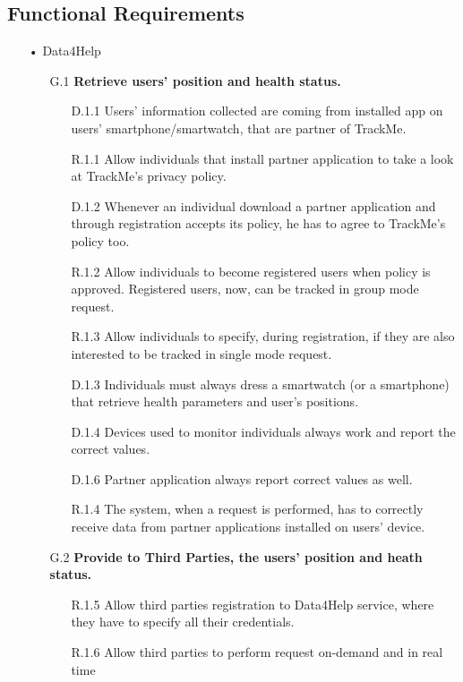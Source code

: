 \subsection{Functional Requirements}
\begin{enumerate}
\item[•]{\Large Data4Help}
	\begin{enumerate}
	\item [G.1] \textbf{Retrieve users' position and health status.}
		\begin{enumerate}
		\item [D.1.1] Users' information collected are coming from installed app on users' smartphone/smartwatch, that are partner of TrackMe.
		\item [R.1.1] Allow individuals that install partner application to take a look at TrackMe's privacy policy.
		\item [D.1.2] Whenever an individual download a partner application and through registration accepts its policy, he has to agree to TrackMe's policy too.
		\item [R.1.2] Allow individuals to become registered users when policy is approved. Registered users, now, can be tracked in group mode request.  
		\item [R.1.3] Allow individuals to specify, during registration, if they are also interested to be tracked in single mode request. 
		\item [D.1.3] Individuals must always dress a smartwatch (or a smartphone) that retrieve health parameters and user's positions.  
		\item [D.1.4] Devices used to monitor individuals always work and report 			the correct values.	
    	\item [D.1.6] Partner application always report correct values as well.
    	\item [R.1.4] The system, when a request is performed, has to correctly receive data from partner applications installed on users' device.
    	\end{enumerate}	
    	
    \item [G.2] \textbf{Provide to Third Parties, the users' position and heath status.}
    	\begin{enumerate} 
    	\item [R.1.5] Allow third parties registration to Data4Help service, where they have to specify all their credentials.
    	\item [R.1.6] Allow third parties to perform request on-demand and in real time
    	\end{enumerate}	
		

\end{enumerate}
\end{enumerate}
